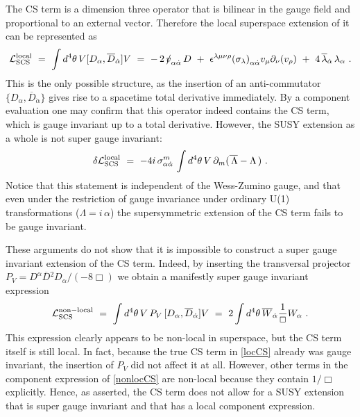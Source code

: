 \documentclass[12pt]{revtex4}
\newcommand{\slashed}[1]{\hbox{{$#1$}\llap{$/$}}}
\begin{document}
The CS term is
a dimension three operator that is bilinear in the gauge field and
proportional to an external vector. 
Therefore the local superspace
extension of it can be represented as 
%
\begin{equation}
{\cal L}_{\rm SCS}^{\rm local} ~=~ \int d^4 \theta \, 
V [ D_\alpha, \overline{D}_{\dot\alpha}] V 
	~=~
	-\, 2\,\slashed{v}_{\alpha\dot{\alpha}}\, D
	~+~ 
	\epsilon^{\lambda\mu\nu\rho} 
	{(\sigma_{\lambda})}_{\alpha\dot{\alpha}} 
	v_\mu \partial_\nu ( v_\rho )
	~+~
	4\, \overline{\lambda}_{\dot{\alpha}}\, \lambda_\alpha ~. 
\label{locCS}
\end{equation} 
%
This is the only possible structure, as the insertion of an anti-commutator 
$\{D_\alpha, \overline{D}_{\dot\alpha}\}$ gives rise to a spacetime
total derivative immediately. By a component evaluation one may
confirm that this operator indeed contains the CS term, which 
is gauge invariant up to a total derivative. However, the
SUSY extension as a whole is not super gauge invariant: 
%
\begin{equation}
\delta {\cal L}_{\rm SCS}^{\rm local} 
~=~ - 4 i\, \sigma_{\alpha\dot{\alpha}}^m\, 
\int d^4 \theta \, 
V\, \partial_m ( \overline{\, \Lambda} - \Lambda \,)~. 
\label{locCStrans} 
\end{equation} 
%
Notice that this statement is independent of the Wess-Zumino
gauge, and that even under the restriction of  gauge invariance
under ordinary U(1) transformations 
($\Lambda = i \,\alpha$) the supersymmetric extension of the CS term
fails to be gauge invariant.  


These arguments do not show that it is impossible to construct a super
gauge invariant extension of the CS term. Indeed, by inserting the
transversal projector 
$P_V = D^\alpha \overline{D}{}^2 D_\alpha/(-8 \Box)$
we obtain a manifestly super gauge invariant expression 
%
\begin{equation}
\label{nonlocCS}
{\cal L}_{\rm SCS}^{\rm non-local} ~=~ \int d^4 \theta \, 
V\, P_V\,  [ D_\alpha, \overline{D}_{\dot\alpha}] V
~=~
2 \int d^4 \theta \, 
\overline{W}_{\dot\alpha} \frac 1{\Box} W_\alpha
~.
\end{equation} 
%
This expression clearly appears to be non-local in superspace, but
the CS term itself is still local. 
In fact, because the true CS term in \eqref{locCS} already was
gauge invariant, the insertion of $P_V$ did not affect it 
at all. 
However, other terms in the component expression of \eqref{nonlocCS} are
non-local because they contain $1/\Box$ explicitly. 
Hence, as
asserted, the CS term does not allow for a SUSY extension that is super
gauge invariant and that has a local component expression. 
\end{document}
